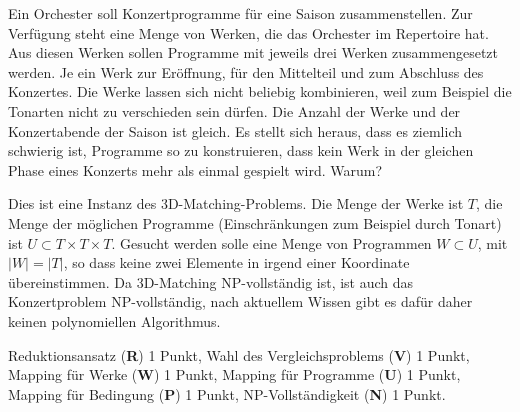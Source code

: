 Ein Orchester soll Konzertprogramme für eine Saison zusammenstellen.
Zur Verfügung steht eine Menge von Werken, die das Orchester im Repertoire hat.
Aus diesen Werken sollen Programme mit jeweils drei Werken zusammengesetzt
werden.
Je ein Werk zur Eröffnung, für den Mittelteil und zum Abschluss des
Konzertes.
Die Werke lassen sich nicht beliebig kombinieren, weil zum Beispiel die
Tonarten nicht zu verschieden sein dürfen.
Die Anzahl der Werke und der Konzertabende der Saison ist gleich.
Es stellt sich heraus, dass es ziemlich schwierig ist, Programme so
zu konstruieren, dass kein Werk in der gleichen Phase eines Konzerts
mehr als einmal gespielt wird.
Warum?


\begin{loesung}
Dies ist eine Instanz des 3D-Matching-Problems.
Die Menge der Werke ist $T$, die Menge der möglichen Programme (Einschränkungen
zum Beispiel durch Tonart) ist $U\subset T\times T\times T$.
Gesucht werden solle eine Menge von Programmen $W\subset U$, mit
$|W|=|T|$, so dass keine zwei Elemente in irgend einer Koordinate
übereinstimmen.
Da 3D-Matching NP-vollständig ist, ist auch das Konzertproblem NP-vollständig,
nach aktuellem Wissen gibt es dafür daher keinen polynomiellen Algorithmus.
\end{loesung}

\begin{bewertung}
Reduktionsansatz ({\bf R}) 1 Punkt,
Wahl des Vergleichsproblems ({\bf V}) 1 Punkt,
Mapping für Werke ({\bf W}) 1 Punkt,
Mapping für Programme ({\bf U}) 1 Punkt,
Mapping für Bedingung ({\bf P}) 1 Punkt,
NP-Vollständigkeit ({\bf N}) 1 Punkt.
\end{bewertung}

